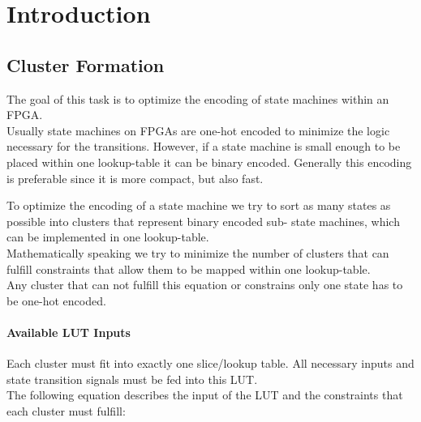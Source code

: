 \chapter{Introduction}
\label{cha:introduction}





\section{Cluster Formation}
\label{sec:clusterSearch}

The goal of this task is to optimize the encoding of state machines within an FPGA.\\
Usually state machines on FPGAs are one-hot encoded to minimize the logic necessary for the transitions. However, if a state machine is small enough to be placed within one lookup-table it can be binary encoded. Generally this encoding is preferable since it is more compact, but also fast.

To optimize the encoding of a state machine we try to sort as many states as possible into clusters that represent binary encoded sub- state machines, which can be implemented in one lookup-table.\\
Mathematically speaking we try to minimize the number of clusters that can fulfill constraints that allow them to be mapped within one lookup-table.\\
Any cluster that can not fulfill this equation or constrains only one state has to be one-hot encoded.



\subsubsection{Available LUT Inputs}
\label{subsubsec:LUTInputs}
Each cluster must fit into exactly one slice/lookup table. All necessary inputs and state transition signals must be fed into this LUT. \\
The following equation describes the input of the LUT and the constraints that each cluster must fulfill:

